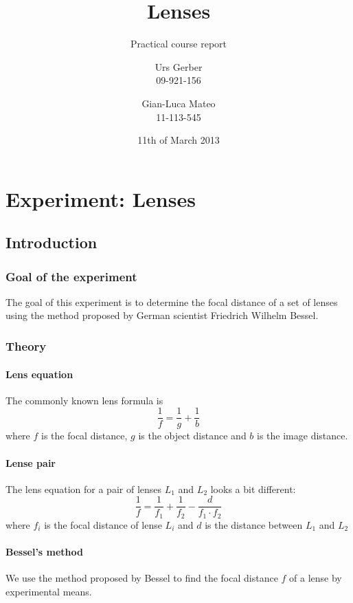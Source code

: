 \documentclass{scrreprt}
\author{Urs Gerber\\09-921-156 \and Gian-Luca Mateo\\11-113-545}
\date{11th of March 2013}
\title{Lenses}
\subtitle{Practical course report}
\begin{document}
\maketitle

\tableofcontents
\newpage

\chapter{Experiment: Lenses}

\section{Introduction}

\subsection{Goal of the experiment}
The goal of this experiment is to determine the focal distance of a set of lenses using the method proposed by German scientist Friedrich Wilhelm Bessel.

\subsection{Theory}
\subsubsection{Lens equation}
The commonly known lens formula is
\begin{equation}
\frac{1}{f} = \frac{1}{g} + \frac{1}{b}
\end{equation}
where $f$ is the focal distance, $g$ is the object distance and $b$ is the image distance.

\subsubsection{Lense pair}
The lens equation for a pair of lenses $L_1$ and $L_2$ looks a bit different:
\begin{equation}
\frac{1}{f}= \frac{1}{f_1} + \frac{1}{f_2} - \frac{d}{f_1 \cdot f_2}
\end{equation}
where $f_i$ is the focal distance of lense $L_i$ and $d$ is the distance between $L_1$ and $L_2$

\subsubsection{Bessel's method}
We use the method proposed by Bessel to find the focal distance $f$ of a lense by experimental means.
\end{document}
